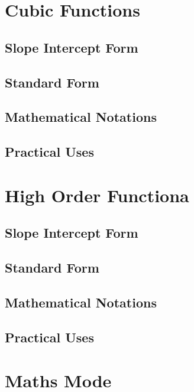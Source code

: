 \documentclass[12pt]{article}%
\begin{document}
%
\section{Cubic Functions}%
\label{sec:CubicFunctions}%
\subsection{Slope Intercept Form}%
\label{subsec:SlopeInterceptForm}%

%
\subsection{Standard Form}%
\label{subsec:StandardForm}%

%
\subsection{Mathematical Notations}%
\label{subsec:MathematicalNotations}%

%
\subsection{Practical Uses}%
\label{subsec:PracticalUses}%

%
\section{High Order Functiona}%
\label{sec:HighOrderFunctiona}%
\subsection{Slope Intercept Form}%
\label{subsec:SlopeInterceptForm}%

%
\subsection{Standard Form}%
\label{subsec:StandardForm}%

%
\subsection{Mathematical Notations}%
\label{subsec:MathematicalNotations}%

%
\subsection{Practical Uses}%
\label{subsec:PracticalUses}%

%
\section{Maths Mode}%
\label{sec:MathsMode}%
\end{document}
